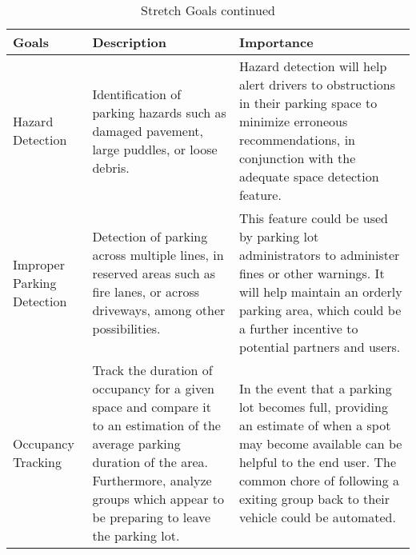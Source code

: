 \documentclass[12pt,letterpaper]{article}
\begin{document}
\begin{table}[hp]
\begin{tabularx}{\textwidth}{|X|X|X|}
\toprule
\textbf{Goals} & \textbf{Description} & \textbf{Importance}\\
\midrule
Hazard Detection & Identification of parking hazards such as damaged pavement,
large puddles, or loose debris. & Hazard detection will help alert drivers to
obstructions in their parking space to minimize erroneous recommendations, in
conjunction with the adequate space detection feature.\\
\hline
Improper Parking Detection & Detection of parking across multiple lines, in
reserved areas such as fire lanes, or across driveways, among other
possibilities. & This feature could be used by parking lot administrators to
administer fines or other warnings. It will help maintain an orderly parking
area, which could be a further incentive to potential partners and users.\\
\hline
Occupancy Tracking & Track the duration of occupancy for a given space and
compare it to an estimation of the average parking duration of the area.
Furthermore, analyze groups which appear to be preparing to leave the parking
lot. & In the event that a parking lot becomes full, providing an estimate of
when a spot may become available can be helpful to the end user. The common
chore of following a exiting group back to their vehicle could be automated. \\
\bottomrule
\end{tabularx}
\caption{Stretch Goals continued} \label{TblStretchGoals2}
\end{table}
\end{document}
